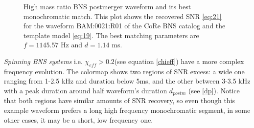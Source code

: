 \begin{figure}[!htbp]
\begin{center}
\begin{minipage}[t]{0.5\linewidth}
\end{minipage}
\captionsetup{width=0.8\textwidth}
\caption[High mass ratio BNS system's postmerger waveform and its best monochromatic match]{High mass ratio BNS postmerger waveform and its best monochromatic match. This plot shows the recovered SNR \ref{eq:21} for the waveform BAM:0021:R01 of the CoRe BNS catalog \cite{Dietrich:2018phi} and the template model \ref{eq:19}. The best matching parameters are $f=1145.57$ Hz and $d=1.14$ ms.}
\label{dmeoiw}
\end{center}
\end{figure}

\FloatBarrier


\newpage

\textit{Spinning BNS systems} i.e. $\chi_{eff}>0.2$(see equation \ref{chieff}) have a more complex frequency evolution. The colormap shows two regions of SNR excess: a wide one ranging from 1-2.5 kHz and duration below 5ms, and the other between 3-3.5 kHz with a peak duration around half waveform's duration $d_{postm}$ (see \ref{dp}). Notice that both regions have similar amounts of SNR recovery, so even though this example waveform prefers a long high frequency monochromatic segment, in some other cases, it may be a short, low frequency one.

